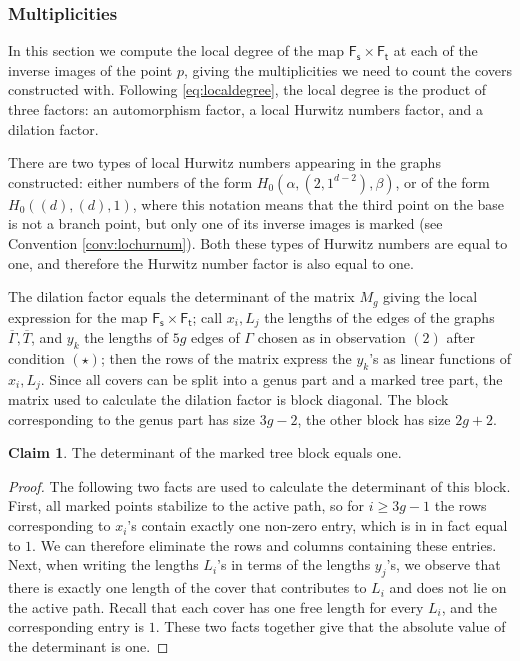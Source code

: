 \documentclass[11pt,reqno]{amsart}
\theoremstyle{definition}
\newtheorem{claim}[theorem]{Claim}
\newcommand{\Ft}{\mathsf{F_t}}
\newcommand{\Fs}{\mathsf{F_s}}
\begin{document}
\subsubsection{Multiplicities}
\label{sec:mult}

In this section we compute the local degree of the map $\Fs\times\Ft$ at each of the inverse images of the point $p$, giving the multiplicities we need to count the covers constructed with.
Following \eqref{eq:localdegree}, the local degree is the product of three factors: an automorphism factor, a local Hurwitz numbers factor, and a dilation factor.

There are two types of local Hurwitz numbers appearing in the graphs constructed: either numbers of the form $H_0(\alpha, (2,1^{d-2}), \beta)$, or of the form $H_0((d),(d), 1)$, where this notation means that the third point on the base is not a branch point, but only one of its inverse images is marked (see Convention \ref{conv:lochurnum}). Both these types of Hurwitz numbers are equal to one, and therefore the Hurwitz number factor is also equal to one.


The dilation factor equals the determinant of the matrix $M_g$ giving the local expression for the map $\Fs\times \Ft$; call $x_i, L_j$ the lengths of the edges of the graphs $\overline{\Gamma}, \overline{T}$, and $y_k$ the lengths of $5g$ edges of $\Gamma$ chosen as in observation $(2)$ after condition $(\star)$; then the rows of the matrix express the $y_k$'s as linear functions of $x_i, L_j$. Since all covers can be split into a genus part  and a marked tree part, the matrix used to calculate the dilation factor is block diagonal. The block corresponding to the genus part has size $3g-2$, the other block has size $2g+2$.
\begin{claim}\label{claim:treeblock}
The determinant of the marked tree block equals one.    
\end{claim}
\begin{proof}
     The following two facts are used to calculate the determinant of this block. First, all marked points stabilize to the active path, so for $i\geq 3g-1$ the rows corresponding to $x_i$'s contain exactly one non-zero entry, which is in in fact equal to $1$. We can therefore eliminate the rows and columns containing these entries.
Next, when writing the lengths $L_i$'s in terms of the lengths $y_j$'s, we observe that there is exactly one length of the cover that contributes to $L_i$ and does not lie on the active path. Recall that each cover has one free length for every $L_i$, and the corresponding  entry is $1$. These two facts together give that the absolute value of the determinant is one. 
\end{proof}
\end{document}
